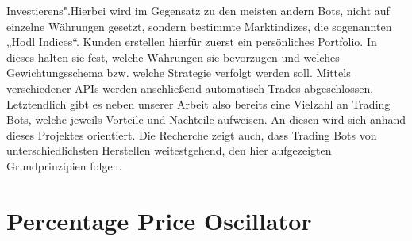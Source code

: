 \documentclass[sigconf]{acmart}
\begin{document}
Investierens".\newline Hierbei wird im Gegensatz zu den meisten andern Bots, nicht auf einzelne Währungen
gesetzt, sondern bestimmte Marktindizes, die sogenannten „Hodl Indices“. Kunden erstellen hierfür
zuerst ein persönliches Portfolio. In dieses halten sie fest, welche Währungen sie bevorzugen und
welches Gewichtungsschema bzw. welche Strategie verfolgt werden soll. Mittels verschiedener APIs
werden anschließend automatisch Trades abgeschlossen.\newline
Letztendlich gibt es neben unserer Arbeit also bereits eine Vielzahl an Trading Bots, welche jeweils
Vorteile und Nachteile aufweisen. An diesen wird sich anhand dieses Projektes orientiert. Die
Recherche zeigt auch, dass Trading Bots von unterschiedlichsten Herstellen weitestgehend, den hier
aufgezeigten Grundprinzipien folgen.



\section{Percentage Price Oscillator}

\end{document}
